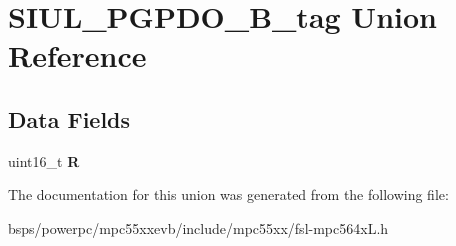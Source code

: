 \hypertarget{unionSIUL__PGPDO__16B__tag}{}\section{S\+I\+U\+L\+\_\+\+P\+G\+P\+D\+O\+\_\+B\+\_\+tag Union Reference}
\label{unionSIUL__PGPDO__16B__tag}
\subsection*{Data Fields}
\begin{DoxyCompactItemize}
\item 
\mbox{\label{unionSIUL__PGPDO__16B__tag_af71806a78248793f4b38c27ad84ba5d9}} 
uint16\+\_\+t {\bfseries R}
\end{DoxyCompactItemize}


The documentation for this union was generated from the following file\+:\begin{DoxyCompactItemize}
\item 
bsps/powerpc/mpc55xxevb/include/mpc55xx/fsl-\/mpc564x\+L.\+h\end{DoxyCompactItemize}
